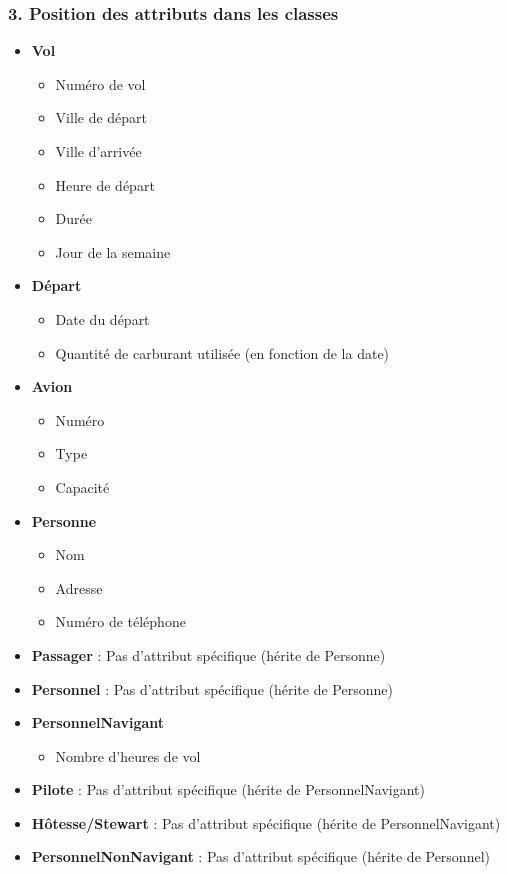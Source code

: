 \documentclass{article}
\begin{document}
\subsubsection*{3. Position des attributs dans les classes}

\begin{itemize}
  \item \textbf{Vol}
  \begin{itemize}
    \item Numéro de vol
    \item Ville de départ
    \item Ville d’arrivée
    \item Heure de départ
    \item Durée
    \item Jour de la semaine
  \end{itemize}
  \item \textbf{Départ}
  \begin{itemize}
    \item Date du départ
    \item Quantité de carburant utilisée (en fonction de la date)
  \end{itemize}
  \item \textbf{Avion}
  \begin{itemize}
    \item Numéro
    \item Type
    \item Capacité
  \end{itemize}
  \item \textbf{Personne}
  \begin{itemize}
    \item Nom
    \item Adresse
    \item Numéro de téléphone
  \end{itemize}
  \item \textbf{Passager} : Pas d’attribut spécifique (hérite de Personne)
  \item \textbf{Personnel} : Pas d’attribut spécifique (hérite de Personne)
  \item \textbf{PersonnelNavigant}
  \begin{itemize}
    \item Nombre d’heures de vol
  \end{itemize}
  \item \textbf{Pilote} : Pas d’attribut spécifique (hérite de PersonnelNavigant)
  \item \textbf{Hôtesse/Stewart} : Pas d’attribut spécifique (hérite de PersonnelNavigant)
  \item \textbf{PersonnelNonNavigant} : Pas d’attribut spécifique (hérite de Personnel)
\end{itemize}
\end{document}
